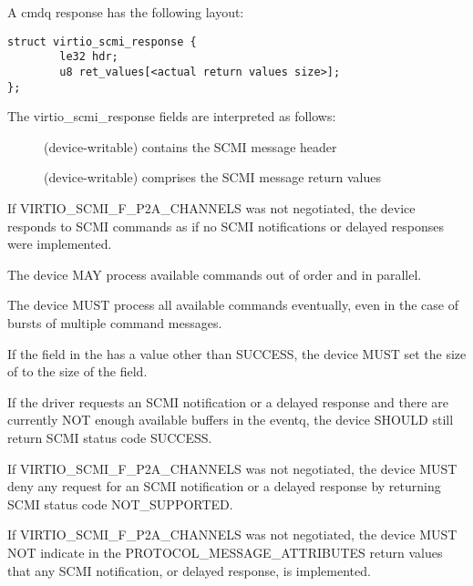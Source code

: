 A cmdq response has the following layout:

\begin{lstlisting}
struct virtio_scmi_response {
        le32 hdr;
        u8 ret_values[<actual return values size>];
};
\end{lstlisting}

The virtio_scmi_response fields are interpreted as follows:

\begin{description}
\item[] (device-writable) contains the SCMI message header
\item[] (device-writable) comprises the SCMI message
return values
\end{description}

If VIRTIO_SCMI_F_P2A_CHANNELS was not negotiated, the device responds to
SCMI commands as if no SCMI notifications or delayed responses were
implemented.


The device MAY process available commands out of order and in parallel.

The device MUST process all available commands eventually, even in the
case of bursts of multiple command messages.

If the  field in the 
 has a value other than SUCCESS, the device MUST set
the size of  to the size of the  field.

If the driver requests an SCMI notification or a delayed response and
there are currently NOT enough available buffers in the eventq, the
device SHOULD still return SCMI status code SUCCESS.

If VIRTIO_SCMI_F_P2A_CHANNELS was not negotiated, the device MUST deny
any request for an SCMI notification or a delayed response by returning
SCMI status code NOT_SUPPORTED.

If VIRTIO_SCMI_F_P2A_CHANNELS was not negotiated, the device MUST NOT
indicate in the PROTOCOL_MESSAGE_ATTRIBUTES return values that any SCMI
notification, or delayed response, is implemented.


